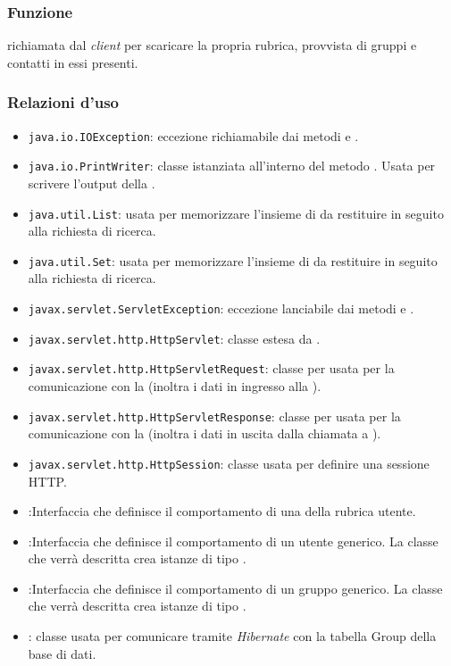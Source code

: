 \begin{description}
\end{description}



\subsubsection*{Funzione}
 richiamata dal \textit{client} per scaricare la propria rubrica, provvista di gruppi e contatti in essi presenti.

\subsubsection*{Relazioni d'uso}

\begin{itemize}
	\item \texttt{java.io.IOException}: eccezione richiamabile dai metodi  e .
	\item \texttt{java.io.PrintWriter}: classe istanziata all'interno del metodo . Usata per scrivere l'output della .
	\item \texttt{java.util.List}: usata per memorizzare l'insieme di  da restituire in seguito alla richiesta di ricerca.
	\item \texttt{java.util.Set}: usata per memorizzare l'insieme di  da restituire in seguito alla richiesta di ricerca.
	\item \texttt{javax.servlet.ServletException}: eccezione lanciabile dai metodi  e .
	\item \texttt{javax.servlet.http.HttpServlet}: classe estesa da .
	\item \texttt{javax.servlet.http.HttpServletRequest}:  classe per usata per la comunicazione con la  (inoltra i dati in ingresso alla ).
	\item \texttt{javax.servlet.http.HttpServletResponse}: classe per usata per la comunicazione con la  (inoltra i dati in uscita dalla chiamata a ).
	\item \texttt{javax.servlet.http.HttpSession}: classe usata per definire una sessione HTTP.
	\item {}:Interfaccia che definisce il comportamento di una  della rubrica utente.
	\item {}:Interfaccia che definisce il comportamento di un utente generico. La classe che verrà descritta crea istanze di tipo .
		\item {}:Interfaccia che definisce il comportamento di un gruppo generico. La classe che verrà descritta crea istanze di tipo .
	\item {}: classe usata per comunicare tramite \textit{Hibernate} con la tabella Group della base di dati.
\end{itemize}


